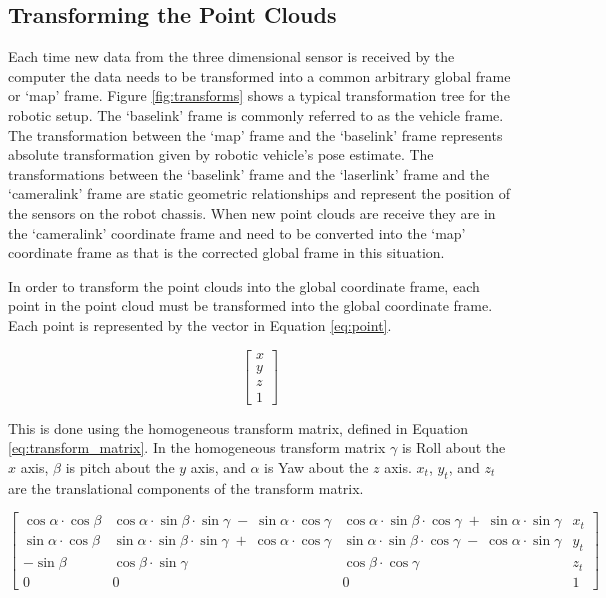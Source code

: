 \documentclass[12pt]{report}
\begin{document}
\subsection{Transforming the Point Clouds}
Each time new data from the three dimensional sensor is received by the computer the data needs to be transformed into a common arbitrary global frame or `map' frame. Figure \ref{fig:transforms} shows a typical transformation tree for the robotic setup. The `base\textunderscore{}link' frame is commonly referred to as the vehicle frame. The transformation between the `map' frame and the `base\textunderscore{}link' frame represents absolute transformation given by robotic vehicle's pose estimate. The transformations between the `base\textunderscore{}link' frame and the `laser\textunderscore{}link' frame and the `camera\textunderscore{}link' frame are static geometric relationships and represent the position of the sensors on the robot chassis. When new point clouds are receive they are in the `camera\textunderscore{}link' coordinate frame and need to be converted into the `map' coordinate frame as that is the corrected global frame in this situation.

In order to transform the point clouds into the global coordinate frame, each point in the point cloud must be transformed into the global coordinate frame.  Each point is represented by the vector in Equation \ref{eq:point}.

\begin{equation} \label{eq:point}
\left[ \begin{array}{c} x \\ y \\ z \\ 1 \end{array} \right]
\end{equation}

This is done using the homogeneous transform matrix\cite{lavalle2006planning}, defined in Equation \ref{eq:transform_matrix}.  In the homogeneous transform matrix $\gamma$ is Roll about the $x$ axis, $\beta$ is pitch about the $y$ axis, and $\alpha$ is Yaw about the $z$ axis.  $x_{t}$, $y_{t}$, and $z_{t}$ are the translational components of the transform matrix.

\begin{equation} \label{eq:transform_matrix}
\left[ \begin{array}{cccc} \cos \alpha \cdot \cos \beta  & \cos \alpha \cdot \sin \beta \cdot \sin \gamma \; -\; \sin \alpha \cdot \cos \gamma  & \cos \alpha \cdot \sin \beta \cdot \cos \gamma \; +\; \sin \alpha \cdot \sin \gamma  & x_{t} \\ \sin \alpha \cdot \cos \beta  & \sin \alpha \cdot \sin \beta \cdot \sin \gamma \; +\; \cos \alpha \cdot \cos \gamma  & \sin \alpha \cdot \sin \beta \cdot \cos \gamma \; -\; \cos \alpha \cdot \sin \gamma  & y_{t} \\ -\sin \beta  & \cos \beta \cdot \sin \gamma  & \cos \beta \cdot \cos \gamma & z_{t} \\ 0 & 0 & 0 & 1 \end{array} \right]
\end{equation}
\end{document}
